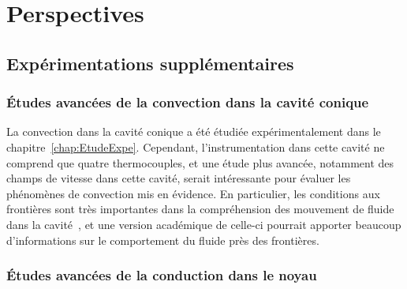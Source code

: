 \chapter{Perspectives}\label{chap:Persp}%
\mylocaltoc




\section{Expérimentations supplémentaires}

\subsection{\'Etudes avancées de la convection dans la cavité conique}
La convection dans la cavité conique a été étudiée expérimentalement dans le chapitre~\ref{chap:EtudeExpe}. Cependant, l'instrumentation dans cette cavité ne comprend que quatre thermocouples, et une étude plus avancée, notamment des champs de vitesse dans cette cavité, serait intéressante pour évaluer les phénomènes de convection mis en évidence. En particulier, les conditions aux frontières sont très importantes dans la compréhension des mouvement de fluide dans la cavité~\cite{mergui_convection_1996}, et une version académique de celle-ci pourrait apporter beaucoup d'informations sur le comportement du fluide près des frontières.

\subsection{\'Etudes avancées de la conduction dans le noyau}
